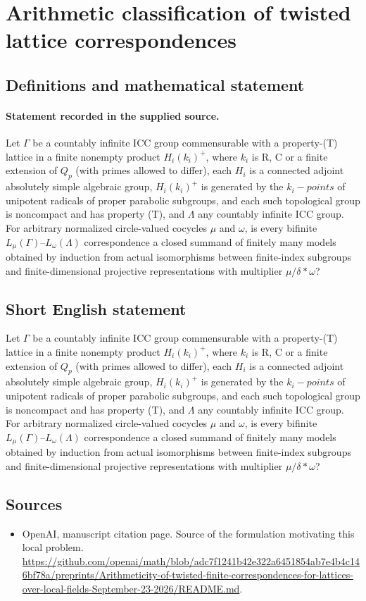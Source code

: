 \documentclass[11pt]{article}
\begin{document}
\section*{Arithmetic classification of twisted lattice correspondences}\label{30007315}
\subsection{Definitions and mathematical statement}
\paragraph{Statement recorded in the supplied source.}
Let $\Gamma $ be a countably infinite ICC group commensurable with a property-(T) lattice in a finite nonempty product $H_i(k_i)^+$, where $k_i$ is R, C or a finite extension of $Q_p$ (with primes allowed to differ), each $H_i$ is a connected adjoint absolutely simple algebraic group, $H_i(k_i)^+$ is generated by the $k_i-points$ of unipotent radicals of proper parabolic subgroups, and each such topological group is noncompact and has property (T), and $\Lambda $ any countably infinite ICC group. For arbitrary normalized circle-valued cocycles $\mu $ and $\omega $, is every bifinite $L_\mu (\Gamma )–L_\omega (\Lambda )$ correspondence a closed summand of finitely many models obtained by induction from actual isomorphisms between finite-index subgroups and finite-dimensional projective representations with multiplier $\mu /\delta *\omega $?
\subsection{Short English statement}
Let $\Gamma $ be a countably infinite ICC group commensurable with a property-(T) lattice in a finite nonempty product $H_i(k_i)^+$, where $k_i$ is R, C or a finite extension of $Q_p$ (with primes allowed to differ), each $H_i$ is a connected adjoint absolutely simple algebraic group, $H_i(k_i)^+$ is generated by the $k_i-points$ of unipotent radicals of proper parabolic subgroups, and each such topological group is noncompact and has property (T), and $\Lambda $ any countably infinite ICC group. For arbitrary normalized circle-valued cocycles $\mu $ and $\omega $, is every bifinite $L_\mu (\Gamma )–L_\omega (\Lambda )$ correspondence a closed summand of finitely many models obtained by induction from actual isomorphisms between finite-index subgroups and finite-dimensional projective representations with multiplier $\mu /\delta *\omega $?
\subsection{Sources}
\begin{itemize}
\item[S1] OpenAI, manuscript citation page. Source of the formulation motivating this local problem.
\url{https://github.com/openai/math/blob/adc7f1241b42e322a6451854ab7e4b4c146bf78a/preprints/Arithmeticity-of-twisted-finite-correspondences-for-lattices-over-local-fields-September-23-2026/README.md}.
\end{itemize}
\end{document}
